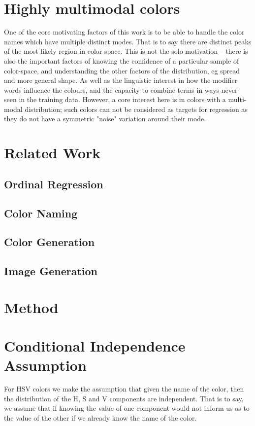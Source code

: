 \documentclass[]{article}
\begin{document}
\section{Highly multimodal colors}
One of the core motivating factors of this work is to be able to handle the color names which have multiple distinct modes.
That is to say there are distinct peaks of the most likely region in color space.
This is not the solo motivation -- there is also the important factors of knowing the confidence of a particular sample of color-space, and understanding the other factors of the distribution, eg spread and more general shape.
As well as the linguistic interest in how the modifier words influence the colours, and the capacity to combine terms in ways never seen in the training data.
However, a core interest here is in colors with a multi-modal distribution; such colors can not be considered as targets for regression as they do not have a symmetric "noise" variation around their mode.






 
\section{Related Work}
\subsection{Ordinal Regression}
\subsection{Color Naming}
\subsection{Color Generation}
\subsection{Image Generation}


\section{Method}
\section{Conditional Independence Assumption}
For HSV colors we make the assumption that given the name of the color, then the distribution of the H, S and V components are independent.
That is to say, we assume that if knowing the value of one component would not inform us as to the value of the other if we already know the name of the color.
\end{document}
